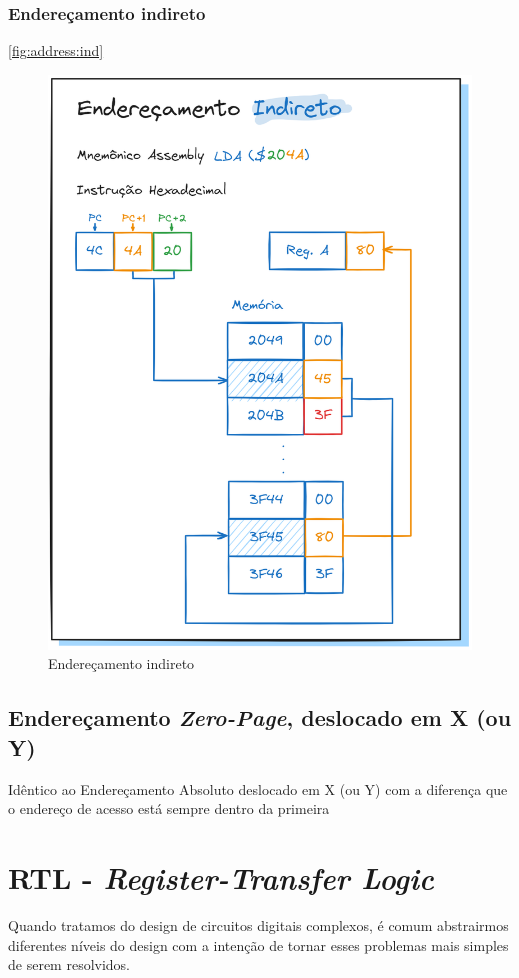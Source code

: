 \documentclass[
	12pt,				  %
	openright,		%
	a4paper,			%
	english,			%
	french,				%
	spanish,			%
	brazil,				%
]{abntex2}
\begin{document}
\subsubsection{Endereçamento indireto}
\autoref{fig:address:ind}
\begin{figure}[h]
	\centering
	\caption{Endereçamento indireto} \label{fig:address:ind}
	\includegraphics[scale=0.25]{../assets/img/addressing-modes-ind.png}
\end{figure}

\subsection{Endereçamento \emph{Zero-Page}, deslocado em X (ou Y)}
Idêntico ao Endereçamento Absoluto deslocado em X (ou Y) com a diferença que o
endereço de acesso está sempre dentro da primeira

\section{RTL - \emph{Register-Transfer Logic}}
Quando tratamos do design de circuitos digitais complexos, é comum abstrairmos
diferentes níveis do design com a intenção de tornar esses problemas mais
simples de serem resolvidos.
\end{document}
